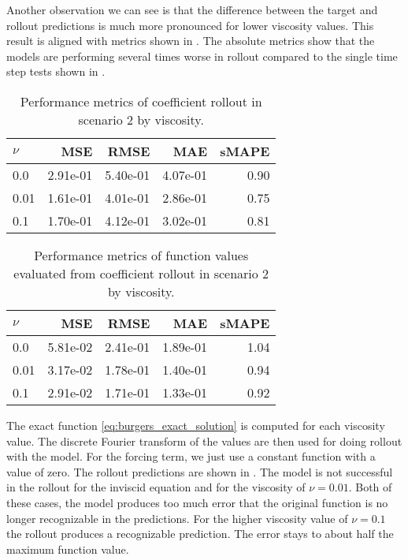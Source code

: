 Another observation we can see is that the difference between the target and rollout predictions is much more pronounced for lower viscosity values. This result is aligned with metrics shown in . The absolute metrics show that the models are performing several times worse in rollout compared to the single time step tests shown in .
\begin{table}[H]
  \caption{Performance metrics of coefficient rollout in scenario 2 by viscosity.}\label{table:scenario_2_rollout_spectral_metrics}
  \centering
  \begin{tabular}{lrrrr}
    \toprule
    \(\nu \) & MSE      & RMSE     & MAE      & sMAPE \\
    \midrule
    0.0      & 2.91e-01 & 5.40e-01 & 4.07e-01 & 0.90  \\
    0.01     & 1.61e-01 & 4.01e-01 & 2.86e-01 & 0.75  \\
    0.1      & 1.70e-01 & 4.12e-01 & 3.02e-01 & 0.81  \\
    \bottomrule
  \end{tabular}
\end{table}
\begin{table}[H]
  \caption{Performance metrics of function values evaluated from coefficient rollout in scenario 2 by viscosity.}\label{table:scenario_2_rollout_function_metrics}
  \centering
  \begin{tabular}{lrrrr}
    \toprule
    \(\nu \) & MSE      & RMSE     & MAE      & sMAPE \\
    \midrule
    0.0      & 5.81e-02 & 2.41e-01 & 1.89e-01 & 1.04  \\
    0.01     & 3.17e-02 & 1.78e-01 & 1.40e-01 & 0.94  \\
    0.1      & 2.91e-02 & 1.71e-01 & 1.33e-01 & 0.92  \\
    \bottomrule
  \end{tabular}
\end{table}
The exact function \cref{eq:burgers_exact_solution} is computed for each viscosity value. The discrete Fourier transform of the values are then used for doing rollout with the model. For the forcing term, we just use a constant function with a value of zero. The rollout predictions are shown in . The model is not successful in the rollout for the inviscid equation and for the viscosity of \(\nu=0.01\). Both of these cases, the model produces too much error that the original function is no longer recognizable in the predictions. For the higher viscosity value of \(\nu=0.1\) the rollout produces a recognizable prediction. The error stays to about half the maximum function value.
